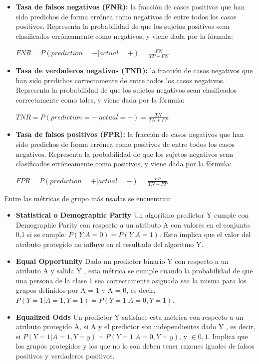 \documentclass[runningheads,a4paper]{llncs}
\begin{document}
\begin{itemize}
   \item {\bf Tasa de falsos negativos (FNR):} la fracci\'on de casos positivos que han sido predichos de forma err\'onea como negativos de entre todos los casos positivos. Representa la probabilidad de que los sujetos positivos sean clasificados err\'oneamente como negativos, y viene dada por la f\'ormula:

${\displaystyle FNR=P(prediction=-|actual=+)={\frac {FN}{TP+FN}}}$\\

   \item {\bf Tasa de verdaderos negativos (TNR):} la fracci\'on de casos negativos que han sido predichos correctamente de entre todos los casos negativos. Representa la probabilidad de que los sujetos negativos sean clasificados correctamente como tales, y viene dada por la f\'ormula:

${\displaystyle TNR=P(prediction=-|actual=-)={\frac {TN}{TN+FP}}}$\\

    \item {\bf Tasa de falsos positivos (FPR):} la fracci\'on de casos negativos que han sido predichos de forma err\'onea como positivos de entre todos los casos negativos. Representa la probabilidad de que los sujetos negativos sean clasificados err\'oneamente como positivos, y viene dada por la f\'ormula:

${\displaystyle FPR=P(prediction=+|actual=-)={\frac {FP}{TN+FP}}}$\\

\end{itemize}

Entre las m\'etricas de grupo m\'as usadas se encuentran:
\begin{itemize}

\item {\bf Statistical o Demographic Parity} \cite{Sa} Un algoritmo predictor Y
cumple con Demographic Parity con respecto a un atributo A con valores en el conjunto
{0,1} si se cumple: $P(Y|A = 0) = P(Y|A = 1)$. Esto implica que el valor del
atributo protegido no influye en el resultado del algoritmo Y.\\

\item {\bf Equal Opportunity } \cite{Sa} \cite{Mo} Dado un predictor binario Y
con respecto a un atributo A y salida Y , esta m\'etrica se cumple cuando la probabilidad de que una
persona de la clase 1 sea correctamente asignada sea la misma para los grupos
definidos por A = 1 y A = 0, es decir, $P(Y = 1|A = 1,Y = 1) = P(Y = 1|A =0,Y = 1)$.\\

\item {\bf Equalized Odds }\cite{Mo} Un predictor Y
satisface esta m\'etrica con respecto a un
atributo protegido A, si A y el predictor son independientes dado Y , es decir,
si $P(Y = 1|A = 1,Y = y) = P(Y = 1|A = 0,Y = y)$, y $\in {0,1}$. Implica que
los grupos protegidos y los que no lo son deben tener razones iguales de falsos
positivos y verdaderos positivos.\\

\end{itemize}
\end{document}
